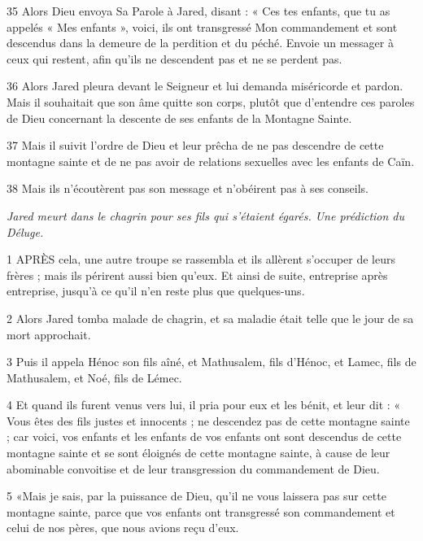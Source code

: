 \par 35 Alors Dieu envoya Sa Parole à Jared, disant : « Ces tes enfants, que tu as appelés « Mes enfants », voici, ils ont transgressé Mon commandement et sont descendus dans la demeure de la perdition et du péché. Envoie un messager à ceux qui restent, afin qu'ils ne descendent pas et ne se perdent pas.

\par 36 Alors Jared pleura devant le Seigneur et lui demanda miséricorde et pardon. Mais il souhaitait que son âme quitte son corps, plutôt que d'entendre ces paroles de Dieu concernant la descente de ses enfants de la Montagne Sainte.

\par 37 Mais il suivit l'ordre de Dieu et leur prêcha de ne pas descendre de cette montagne sainte et de ne pas avoir de relations sexuelles avec les enfants de Caïn.

\par 38 Mais ils n'écoutèrent pas son message et n'obéirent pas à ses conseils.


\par \textit{Jared meurt dans le chagrin pour ses fils qui s'étaient égarés. Une prédiction du Déluge.}

\par 1 APRÈS cela, une autre troupe se rassembla et ils allèrent s'occuper de leurs frères ; mais ils périrent aussi bien qu'eux. Et ainsi de suite, entreprise après entreprise, jusqu’à ce qu’il n’en reste plus que quelques-uns.

\par 2 Alors Jared tomba malade de chagrin, et sa maladie était telle que le jour de sa mort approchait.

\par 3 Puis il appela Hénoc son fils aîné, et Mathusalem, fils d'Hénoc, et Lamec, fils de Mathusalem, et Noé, fils de Lémec.

\par 4 Et quand ils furent venus vers lui, il pria pour eux et les bénit, et leur dit : « Vous êtes des fils justes et innocents ; ne descendez pas de cette montagne sainte ; car voici, vos enfants et les enfants de vos enfants ont sont descendus de cette montagne sainte et se sont éloignés de cette montagne sainte, à cause de leur abominable convoitise et de leur transgression du commandement de Dieu.

\par 5 «Mais je sais, par la puissance de Dieu, qu'il ne vous laissera pas sur cette montagne sainte, parce que vos enfants ont transgressé son commandement et celui de nos pères, que nous avions reçu d'eux.

